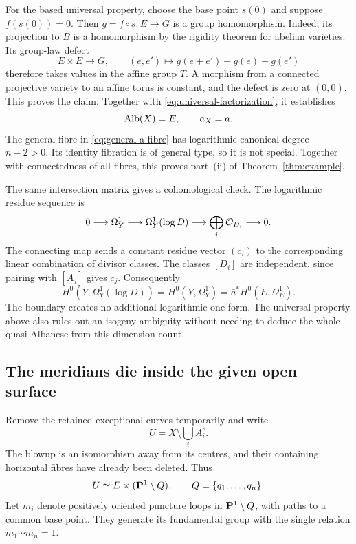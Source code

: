 For the based universal property, choose the base point $s(0)$ and
suppose $f(s(0))=0$. Then $g=f\circ s:E\to G$ is a group homomorphism.
Indeed, its projection to $B$ is a homomorphism by the rigidity theorem
for abelian varieties. Its group-law defect
\[
 E\times E\longrightarrow G,
 \qquad(e,e')\longmapsto g(e+e')-g(e)-g(e')
\]
therefore takes values in the affine group $T$. A morphism from a
connected projective variety to an affine torus is constant, and the
defect is zero at $(0,0)$. This proves the claim. Together with
\eqref{eq:universal-factorization}, it establishes
\[
 \operatorname{Alb}(X)=E,\qquad a_X=a.
\]
The general fibre in \eqref{eq:general-a-fibre} has logarithmic
canonical degree $n-2>0$. Its identity fibration is of general type, so
it is not special. Together with connectedness of all fibres, this
proves part~(ii) of Theorem~\ref{thm:example}.

\begin{remark}\label{rem:log-forms}
The same intersection matrix gives a cohomological check. The
logarithmic residue sequence is
\[
 0\longrightarrow\Omega_Y^1\longrightarrow\Omega_Y^1(\log D)
 \longrightarrow\bigoplus_i\mathcal O_{D_i}\longrightarrow0.
\]
The connecting map sends a constant residue vector $(c_i)$ to the
corresponding linear combination of divisor classes. The classes $[D_i]$
are independent, since pairing with $[A_j]$ gives $c_j$. Consequently
\[
 H^0(Y,\Omega_Y^1(\log D))=H^0(Y,\Omega_Y^1)
   =\bar a^*H^0(E,\Omega_E^1).
\]
The boundary creates no additional logarithmic one-form. The universal
property above also rules out an isogeny ambiguity without needing to
deduce the whole quasi-Albanese from this dimension count.
\end{remark}

\subsection{The meridians die inside the given open surface}
Remove the retained exceptional curves temporarily and write
\[
 U=X\setminus\bigcup_iA_i^\circ.
\]
The blowup is an isomorphism away from its centres, and their containing
horizontal fibres have already been deleted. Thus
\begin{equation}\label{eq:product-open}
 U\simeq E\times(\mathbf P^1\setminus Q),
 \qquad Q=\{q_1,\ldots,q_n\}.
\end{equation}
Let $m_i$ denote positively oriented puncture loops in
$\mathbf P^1\setminus Q$, with paths to a common base point. They generate its
fundamental group with the single relation $m_1\cdots m_n=1$.

